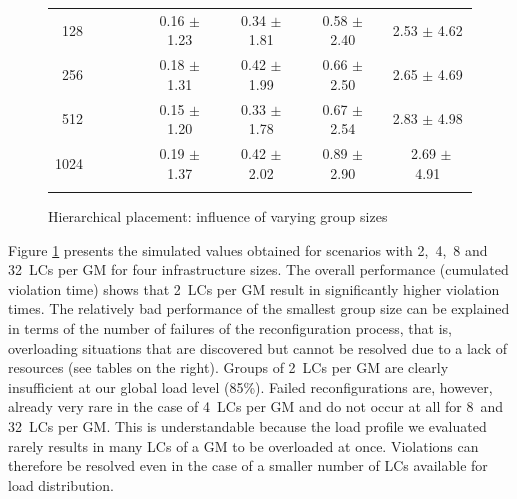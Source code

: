 \begin{figure}
\begin{minipage}{.60\textwidth}
{{\begin{tabular}[b]{|r@{\:}||@{\:}c@{\:}|@{\:}c@{\:}|@{\:}c@{\:}|@{\:}c@{\:}|}
        128~~~~~~~ &   0.16 $\pm$   1.23 &   0.34 $\pm$   1.81 &   0.58 $\pm$   2.40 &   2.53 $\pm$   4.62  \\
        256~~~~~~~ &   0.18 $\pm$   1.31 &   0.42 $\pm$   1.99 &   0.66 $\pm$   2.50 &   2.65 $\pm$   4.69  \\
        512~~~~~~~ &   0.15 $\pm$   1.20 &   0.33 $\pm$   1.78 &   0.67 $\pm$   2.54 &   2.83 $\pm$   4.98  \\
       1024~~~~~~~ &   0.19 $\pm$   1.37 &   0.42 $\pm$   2.02 &   0.89 $\pm$   2.90 &   ~2.69 $\pm$   4.91

      \Rstrut  \\ \hline
      \thickhline
  \end{tabular} }
  \label{fig:groupSizesComputationTime}
  }
\end{minipage}
\vspace*{-.6cm}
\caption{Hierarchical placement: influence of varying group sizes}
\label{fig:snoozeGroupSizes}
\vspace*{-.6cm}
\end{figure}
%
%
Figure \ref{fig:snoozeGroupSizes} presents the simulated values
obtained for scenarios with 2,~4,~8 and 32~LCs per GM for four
infrastructure sizes. The overall performance (\ie cumulated violation
time) shows that
2~LCs per GM result in significantly higher violation times.
The relatively bad performance of the smallest group size can be
explained in terms of the number of failures of the reconfiguration
process, that is, overloading situations that are discovered but
cannot be resolved
due to a lack of resources (see tables on the right).  Groups of 2~LCs
per GM are clearly insufficient at our global load level (85\%).
Failed reconfigurations are, however, already very rare in the case of
4~LCs per GM and do not occur at all for 8~and 32~LCs per GM. This is
understandable because
the load profile we evaluated rarely results in many LCs of a GM to be
overloaded at once. Violations can therefore be resolved even in the
case of a smaller number of LCs available for load distribution.
